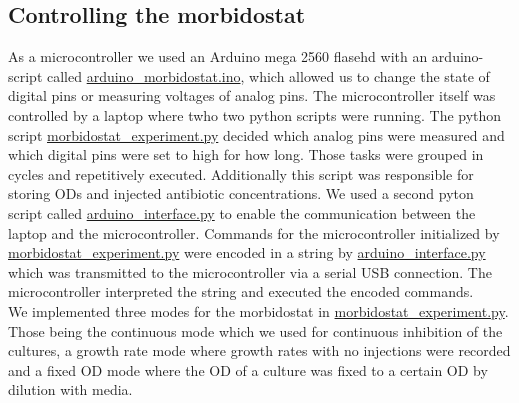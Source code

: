 \subsection{Controlling the morbidostat}
As a microcontroller we used an Arduino mega 2560 flasehd with an arduino-script called \href{https://github.com/nahanoo/ESBL\_project/}{arduino_morbidostat.ino}, which allowed us to change the state of digital pins or measuring voltages of analog pins. The microcontroller itself was controlled by a laptop where twho two python scripts were running. The python script \href{https://github.com/nahanoo/ESBL\_project/}{morbidostat\_experiment.py} decided which analog pins were measured and which digital pins were set to high for how long. Those tasks were grouped in cycles and repetitively executed. Additionally this script was responsible for storing ODs and injected antibiotic concentrations. We used a second pyton script called \href{https://github.com/nahanoo/ESBL\_project/}{arduino\_interface.py} to enable the communication between the laptop and the microcontroller. Commands for the microcontroller initialized by \href{https://github.com/nahanoo/ESBL\_project/}{morbidostat\_experiment.py} were encoded in a string by \href{https://github.com/nahanoo/ESBL\_project/}{arduino\_interface.py} which was transmitted to the microcontroller via a serial USB connection. The microcontroller interpreted the string and executed the encoded commands. \\
We implemented three modes for the morbidostat in \href{https://github.com/nahanoo/ESBL\_project/}{morbidostat\_experiment.py}. Those being the continuous mode which we used for continuous inhibition of the cultures, a growth rate mode where growth rates with no injections were recorded and a fixed OD mode where the OD of a culture was fixed to a certain OD by dilution with media. \\   

